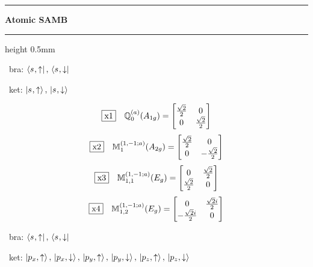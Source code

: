 \documentclass[fleqn,10pt,landscape]{jsarticle}
\begin{document}
\vspace{5mm}
\noindent \rule[0.5mm]{5mm}{0.5mm}\hspace{3mm}\textbf{Atomic SAMB}\hspace{3mm}\leaders\hrule height 0.5mm\hfill\kern0pt
\vspace{3mm}

\vspace{5mm}

\noindent\textbullet\, bra: $\bra{s_{},\uparrow},\, \bra{s_{},\downarrow}$

\noindent\textbullet\, ket: $\ket{s_{},\uparrow},\, \ket{s_{},\downarrow}$

\begin{dmath*}
\fbox{x1}\quad \mathbb{Q}_{0}^{(a)}(A_{1g})=\begin{bmatrix} \frac{\sqrt{2}}{2} & 0 \\ 0 & \frac{\sqrt{2}}{2} \end{bmatrix}
\end{dmath*}
\begin{dmath*}
\fbox{x2}\quad \mathbb{M}_{1}^{(1,-1;a)}(A_{2g})=\begin{bmatrix} \frac{\sqrt{2}}{2} & 0 \\ 0 & - \frac{\sqrt{2}}{2} \end{bmatrix}
\end{dmath*}
\begin{dmath*}
\fbox{x3}\quad \mathbb{M}_{1,1}^{(1,-1;a)}(E_{g})=\begin{bmatrix} 0 & \frac{\sqrt{2}}{2} \\ \frac{\sqrt{2}}{2} & 0 \end{bmatrix}
\end{dmath*}
\begin{dmath*}
\fbox{x4}\quad \mathbb{M}_{1,2}^{(1,-1;a)}(E_{g})=\begin{bmatrix} 0 & \frac{\sqrt{2} i}{2} \\ - \frac{\sqrt{2} i}{2} & 0 \end{bmatrix}
\end{dmath*}
\vspace{5mm}

\noindent\textbullet\, bra: $\bra{s_{},\uparrow},\, \bra{s_{},\downarrow}$

\noindent\textbullet\, ket: $\ket{p_{x},\uparrow},\, \ket{p_{x},\downarrow},\, \ket{p_{y},\uparrow},\, \ket{p_{y},\downarrow},\, \ket{p_{z},\uparrow},\, \ket{p_{z},\downarrow}$
\end{document}
